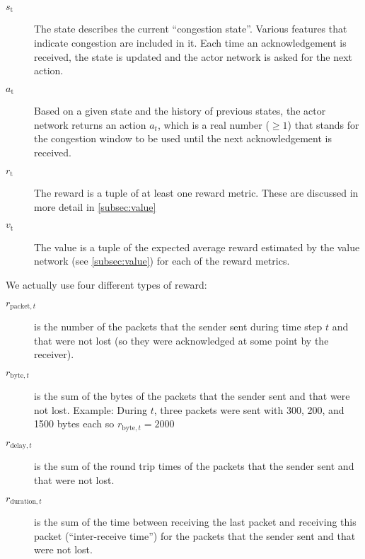 \documentclass[sigconf]{acmart}
\begin{document}
\begin{description}
\item[$\textit{s}_\text{t}$] The state  describes the current ``congestion state''. Various features that indicate congestion are included in it. Each time an acknowledgement is received, the state is updated and the actor network is asked for the next action. 
\item[$\textit{a}_\text{t}$] Based on a given state and the history of previous states, the actor network returns an action $a_t$, which is a real number ($\geq 1$) that stands for the congestion window to be used until the next acknowledgement is received. 
\item[$\textit{r}_\text{t}$] The reward is a tuple of at least one reward metric. These are discussed in more detail in \autoref{subsec:value}
\item[$\textit{v}_\text{t}$] The value is a tuple of the expected average reward estimated by the value network (see \autoref{subsec:value}) for each of the reward metrics. 
\end{description}

We actually use four different types of reward: 
\begin{description}
\item[$\textit{r}_{\text{packet},t}$] is the number of the packets that the sender sent during time step $t$ and that were not lost (so they were acknowledged at some point by the receiver).
\item[$\textit{r}_{\text{byte},t}$] is the sum of the bytes of the packets that the sender sent and that were not lost. Example: During $t$, three packets were sent with 300, 200, and 1500 bytes each so $\textit{r}_{\text{byte},t} = 2000$
\item[$\textit{r}_{\text{delay},t}$] is the sum of the round trip times of the packets that the sender sent and that were not lost.
\item[$\textit{r}_{\text{duration},t}$] is the sum of the time between receiving the last packet and receiving this packet (``inter-receive time'') for the packets that the sender sent and that were not lost.
\end{description}

\end{document}
